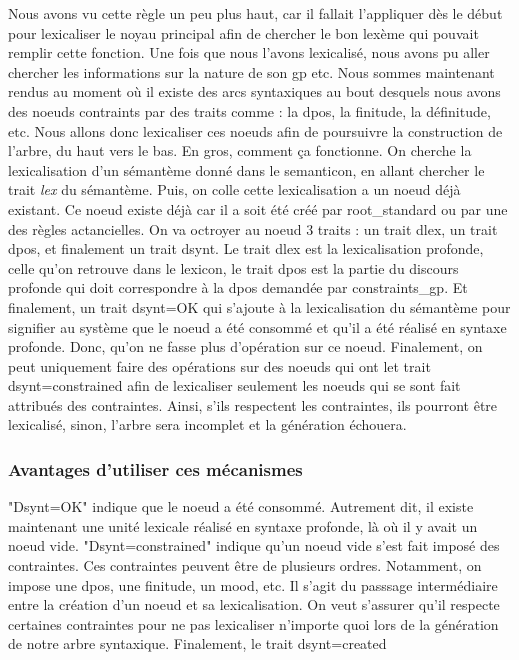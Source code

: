 Nous avons vu cette règle un peu plus haut, car il fallait l'appliquer dès le début pour lexicaliser le noyau principal afin de chercher le bon lexème qui pouvait remplir cette fonction. Une fois que nous l'avons lexicalisé, nous avons pu aller chercher les informations sur la nature de son gp etc. Nous sommes maintenant rendus au moment où il existe des arcs syntaxiques au bout desquels nous avons des noeuds contraints par des traits comme : la dpos, la finitude, la définitude, etc. Nous allons donc lexicaliser ces noeuds afin de poursuivre la construction de l'arbre, du haut vers le bas. En gros, comment ça fonctionne. On cherche la lexicalisation d'un sémantème donné dans le semanticon, en allant chercher le trait \emph{lex} du sémantème. Puis, on colle cette lexicalisation a un noeud déjà existant. Ce noeud existe déjà car il a soit été créé par root{\_}standard ou par une des règles actancielles. On va octroyer au noeud 3 traits : un trait dlex, un trait dpos, et finalement un trait dsynt. Le trait dlex est la lexicalisation profonde, celle qu'on retrouve dans le lexicon, le trait dpos est la partie du discours profonde qui doit correspondre à la dpos demandée par constraints{\_}gp. Et finalement, un trait dsynt=OK qui s'ajoute à la lexicalisation du sémantème pour signifier au système que le noeud a été consommé et qu'il a été réalisé en syntaxe profonde. Donc, qu'on ne fasse plus d'opération sur ce noeud. Finalement, on peut uniquement faire des opérations sur des noeuds qui ont let trait dsynt=constrained afin de lexicaliser seulement les noeuds qui se sont fait attribués des contraintes. Ainsi, s'ils respectent les contraintes, ils pourront être lexicalisé, sinon, l'arbre sera incomplet et la génération échouera.

\subsubsection{Avantages d'utiliser ces mécanismes}

"Dsynt=OK" indique que le noeud a été consommé. Autrement dit, il existe maintenant une unité lexicale réalisé en syntaxe profonde, là où il y avait un noeud vide.
"Dsynt=constrained" indique qu'un noeud vide s'est fait imposé des contraintes. Ces contraintes peuvent être de plusieurs ordres. Notamment, on impose une dpos, une finitude, un mood, etc. Il s'agit du passsage intermédiaire entre la création d'un noeud et sa lexicalisation. On veut s'assurer qu'il respecte certaines contraintes pour ne pas lexicaliser n'importe quoi lors de la génération de notre arbre syntaxique.
Finalement, le trait dsynt=created 

